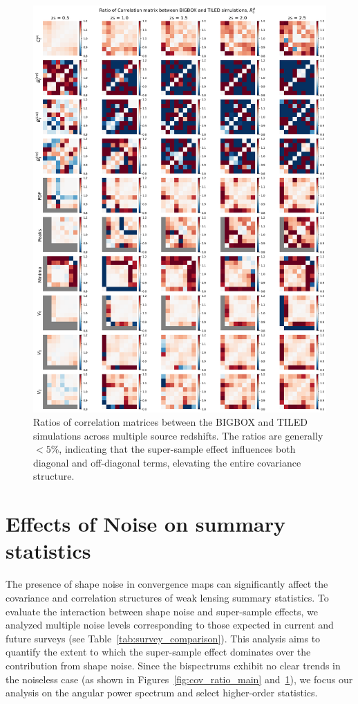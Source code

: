 \begin{figure}[p]
    \centering
    \includegraphics[width=\textwidth]{figures/results/corr_ratio.png}
    \caption[Ratios of Correlation Matrices between BIGBOX and TILED Simulations]{Ratios of correlation matrices between the BIGBOX and TILED simulations across multiple source redshifts. The ratios are generally $< 5\%$, indicating that the super-sample effect influences both diagonal and off-diagonal terms, elevating the entire covariance structure.
    }
    \label{fig:corr_ratio_main}
\end{figure}

\clearpage

\section{Effects of Noise on summary statistics}
The presence of shape noise in convergence maps can significantly affect the covariance and correlation structures of weak lensing summary statistics. To evaluate the interaction between shape noise and super-sample effects, we analyzed multiple noise levels corresponding to those expected in current and future surveys (see Table~\ref{tab:survey_comparison}). This analysis aims to quantify the extent to which the super-sample effect dominates over the contribution from shape noise. Since the bispectrums exhibit no clear trends in the noiseless case (as shown in Figures~\ref{fig:cov_ratio_main} and~\ref{fig:corr_ratio_main}), we focus our analysis on the angular power spectrum and select higher-order statistics.

